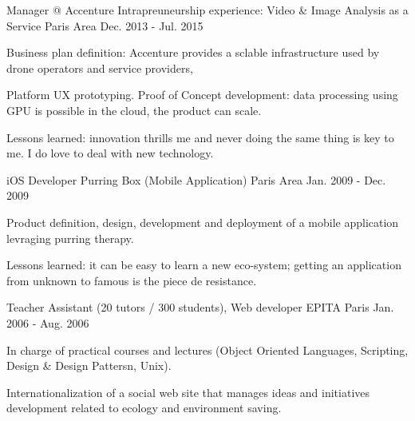 
\begin{cventries}

  \cventry
    {Manager @ Accenture} %
    {Intrapreuneurship experience: Video \& Image Analysis as a Service} %
    {Paris Area} %
    {Dec. 2013 - Jul. 2015} %
    {
      \begin{cvitems} %
        \item {Business plan definition: Accenture provides a sclable infrastructure used by drone operators and service providers,}
        \item {Platform UX prototyping. Proof of Concept development: data processing using GPU is possible in the cloud, the product can scale.}
        \item {Lessons learned: innovation thrills me and never doing the same thing is key to me. I do love to deal with new technology.}
      \end{cvitems}
    }

  \cventry
    {iOS Developer} %
    {Purring Box (Mobile Application)} %
    {Paris Area} %
    {Jan. 2009 - Dec. 2009} %
    {
      \begin{cvitems} %
        \item {Product definition, design, development and deployment of a mobile application levraging purring therapy.}
        \item {Lessons learned: it can be easy to learn a new eco-system; getting an application from unknown to famous is the piece de resistance.}
      \end{cvitems}
    }

  \cventry
    {Teacher Assistant (20 tutors / 300 students), Web developer} %
    {EPITA} %
    {Paris} %
    {Jan. 2006 - Aug. 2006} %
    {
      \begin{cvitems} %
        \item {In charge of practical courses and lectures (Object Oriented Languages, Scripting, Design \& Design Pattersn, Unix).}
        \item {Internationalization of a social web site that manages ideas and initiatives development related to ecology and environment saving.}
      \end{cvitems}
    }

\end{cventries}
